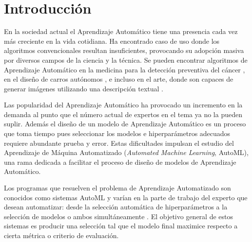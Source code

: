 \chapter*{Introducción}\label{chapter:introduction}
En la sociedad actual el Aprendizaje Autom\'atico tiene una presencia cada vez m\'as creciente en la vida cotidiana. Ha encontrado caso de uso donde los algoritmos convencionales resultan insuficientes, provocando su adopci\'on masiva por diversos campos de la ciencia y la t\'ecnica.
Se pueden encontrar algoritmos de Aprendizaje Autom\'atico en la medicina para la detecci\'on preventiva del c\'ancer , en el dise\~no de carros aut\'onomos , e incluso en el arte, donde son capaces de generar im\'agenes utilizando una descripci\'on textual .

Las popularidad del Aprendizaje Autom\'atico ha provocado un incremento en la demanda al punto que el n\'umero actual de expertos en el tema ya no la pueden suplir. Adem\'as el dise\~no de un modelo de Aprendizaje Autom\'atico es un proceso que toma tiempo pues seleccionar los modelos e hiperpar\'ametros adecuados requiere abundante prueba y error.
Estas dificultades impulsan el estudio del Aprendizaje de M\'aquina Automatizado (\textit{Automated Machine Learning}, AutoML), una rama dedicada a facilitar el proceso de dise\~no de modelos de Aprendizaje Autom\'atico.

Los programas que resuelven el problema de Aprendizaje Automatizado son conocidos como sistemas AutoML y var\'ian en la parte de trabajo del experto que desean automatizar: desde la selecci\'on autom\'atica de hiperpar\'ametros  a la selecci\'on de modelos  o ambos  simult\'aneamente . El objetivo general de estos sistemas es producir una selecci\'on tal que el modelo final maximice respecto a cierta m\'etrica o criterio de evaluaci\'on. 



